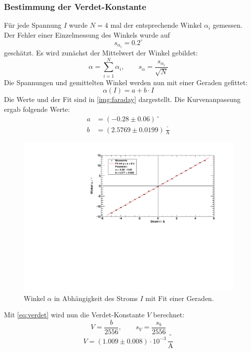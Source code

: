 \subsubsection{Bestimmung der Verdet-Konstante}
Für jede Spannung $I$ wurde $N=4$ mal der entsprechende Winkel $\alpha_i$ gemessen. Der Fehler einer Einzelmessung des Winkels wurde auf
\begin{equation}
  s_{\alpha_i} = 0.2^\circ
\end{equation}  %
geschätzt. Es wird zunächst der Mittelwert der Winkel gebildet:
\begin{equation}
  \alpha = \sum_{i=1}^{N} \alpha_i, \qquad s_{\alpha} = \frac{s_{\alpha_i}}{\sqrt{N}}
\end{equation}
Die Spannungen und gemittelten Winkel werden nun mit einer Geraden gefittet:
\begin{equation}
  \alpha(I) = a + b \cdot I
\end{equation}
Die Werte und der Fit sind in \autoref{img:faraday} dargestellt. Die Kurvenanpassung ergab folgende Werte:
\begin{equation}
\begin{split}
  \label{eq:faraday:params}
  a &= (-0.28 \pm 0.06)\,{}^\circ \\
  b &= (2.5769 \pm 0.0199)\,\frac{{}^\circ}{\text{A}}
\end{split}
\end{equation}
\begin{figure}[H]
\begin{center}
  \includegraphics[width=\textwidth]{../img/faraday.pdf}
  \caption{Winkel $\alpha$ in Abhängigkeit des Stroms $I$ mit Fit einer Geraden.}
  \label{img:faraday}
\end{center}
\end{figure}
Mit \autoref{eq:verdet} wird nun die Verdet-Konstante $V$ berechnet:
\begin{equation}
  \label{eq:eval:verdet}
  V = \frac{b}{2556}, \qquad s_V = \frac{s_b}{2556}
\end{equation}
\begin{equation}
  V = (1.009 \pm 0.008) \cdot 10^{-3}\,\frac{{}^\circ}{\text{A}}
\end{equation}

